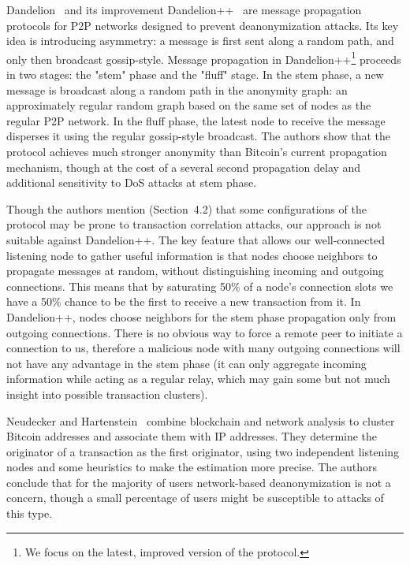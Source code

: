 Dandelion~\cite{Venkatakrishnan2017} and its improvement Dandelion++~\cite{Fanti2018} are message propagation protocols for P2P networks designed to prevent deanonymization attacks.
Its key idea is introducing asymmetry: a message is first sent along a random path, and only then broadcast gossip-style.
Message propagation in Dandelion++\footnote{We focus on the latest, improved version of the protocol.} proceeds in two stages: the "stem" phase and the "fluff" stage.
In the stem phase, a new message is broadcast along a random path in the anonymity graph: an approximately regular random graph based on the same set of nodes as the regular P2P network.
In the fluff phase, the latest node to receive the message disperses it using the regular gossip-style broadcast.
The authors show that the protocol achieves much stronger anonymity than Bitcoin's current propagation mechanism, though at the cost of a several second propagation delay and additional sensitivity to DoS attacks at stem phase. 

Though the authors mention (Section~4.2) that some configurations of the protocol may be prone to transaction  correlation attacks, our approach is not suitable against Dandelion++.
The key feature that allows our well-connected listening node to gather useful information is that nodes choose neighbors to propagate messages at random, without distinguishing incoming and outgoing connections.
This means that by saturating 50\% of a node's connection slots we have a 50\% chance to be the first to receive a new transaction from it.
In Dandelion++, nodes choose neighbors for the stem phase propagation only from outgoing connections.
There is no obvious way to force a remote peer to initiate a connection to us, therefore a malicious node with many outgoing connections will not have any advantage in the stem phase (it can only aggregate incoming information while acting as a regular relay, which may gain some but not much insight into possible transaction clusters).

Neudecker and Hartenstein~\cite{Neudecker2017} combine blockchain and network analysis to cluster Bitcoin addresses and associate them with IP addresses.
They determine the originator of a transaction as the first originator, using two independent listening nodes and some heuristics to make the estimation more precise.
The authors conclude that for the majority of users network-based deanonymization is not a concern, though a small percentage of users might be susceptible to attacks of this type.

